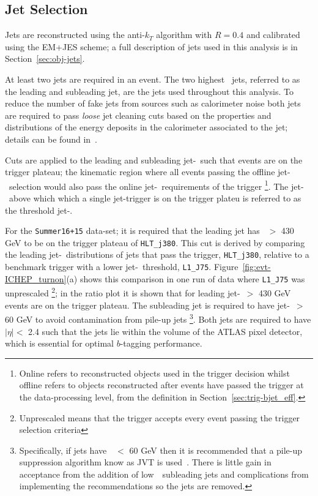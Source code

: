 \subsection{Jet Selection}
\label{sec:evt-sel-jets}

Jets are reconstructed using the anti-$k_T$ algorithm with $R=0.4$
and calibrated using the EM+JES scheme;
a full description of jets used in this analysis is in Section~\ref{sec:obj-jets}.

At least two jets are required in an event.
The two highest \pT~jets, referred to as the leading and subleading jet,
are the jets used throughout this analysis.
To reduce the number of fake jets from sources such as calorimeter noise
both jets are required to pass \textit{loose} jet cleaning cuts
based on the properties and distributions of the energy deposits in the calorimeter associated to the jet;
details can be found in~\cite{evt-jet_cleaning}.

Cuts are applied to the leading and subleading jet-\pT~such that events are on the trigger plateau;
the kinematic region where all events passing the offline jet-\pT~selection
would also pass the online jet-\pT~requirements of the trigger
\footnote{Online refers to reconstructed objects used in the trigger decision
  whilst offline refers to objects reconstructed after events have passed the trigger at the data-processing level,
  from the definition in Section~\ref{sec:trig-bjet_eff}.}.
The jet-\pT~above which which a single jet-trigger is on the trigger plateu is referred to as the threshold jet-\pT.

For the \verb|Summer16+15| data-set; it is required that the leading jet has \pT~$>$ 430 GeV to be on the trigger plateau of \verb|HLT_j380|.
This cut is derived by comparing the leading jet-\pT~distributions of jets that pass the trigger, \verb|HLT_j380|,
relative to a benchmark trigger with a lower jet-\pT~threshold, \verb|L1_J75|.
Figure~\ref{fig:evt-ICHEP_turnon}(a) shows this comparison in one run of data where \verb|L1_J75| was unprescaled
\footnote{Unprescaled means that the trigger accepts every event passing the trigger selection criteria};
in the ratio plot it is shown that for leading jet-\pT~$>$ 430 GeV events are on the trigger plateau.
The subleading jet is required to have jet-\pT~$>$ 60 GeV
to avoid contamination from pile-up jets
\footnote{Specifically, if jets have~\pT~$<$ 60 GeV then it is recommended that
  a pile-up suppression algorithm know as JVT is used~\cite{evt-jvt}.
  There is little gain in acceptance from the addition of low~\pT~subleading jets and
  complications from implementing the recommendations so the jets are removed. }.
Both jets  are required to have $|\eta| <$ 2.4
such that the jets lie within the volume of the ATLAS pixel detector,
which is essential for optimal $b$-tagging performance.

